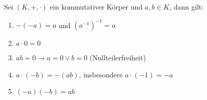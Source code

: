 Sei $(K, +, \cdot)$ ein kommutativer Körper und $a, b \in K$, dann gilt:

\begin{enumerate}
    \item $-(-a) = a$ und $(a^{-1})^{-1} = a$
    \item $a \cdot 0 = 0$
    \item $ab = 0 \rightarrow a = 0 \lor b = 0$ (Nullteilerfreiheit)
    \item $a \cdot (-b) = -(ab)$, insbesondere $a \cdot (-1) = -a$
    \item $(-a)(-b) = ab$
\end{enumerate}